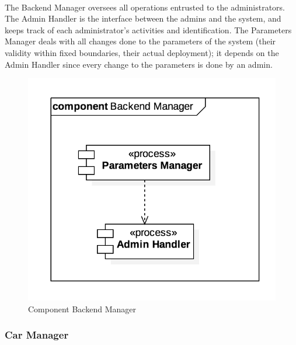 		\paragraph{} The Backend Manager oversees all operations entrusted to the administrators. The Admin Handler is the interface between the admins and the system, and keeps track of each administrator's activities and identification. The Parameters Manager deals with all changes done to the parameters of the system (their validity within fixed boundaries, their actual deployment); it depends on the Admin Handler since every change to the parameters is done by an admin. %
		\begin{figure}[h]
				\includegraphics[scale=0.4, center]{img/component_diagrams/11_backend_manager.png}
				\caption{Component Backend Manager}
			\end{figure}
\FloatBarrier
	
		
		
		
		\subsubsection*{Car Manager}
			
		

